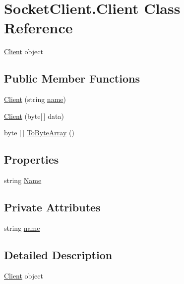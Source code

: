 \hypertarget{class_socket_client_1_1_client}{}\section{Socket\+Client.\+Client Class Reference}
\label{class_socket_client_1_1_client}


\hyperlink{class_socket_client_1_1_client}{Client} object  


\subsection*{Public Member Functions}
\begin{DoxyCompactItemize}
\item 
\hyperlink{class_socket_client_1_1_client_a28a95475e56ee3c7b77514f3723c9b54}{Client} (string \hyperlink{class_socket_client_1_1_client_a162db8b8ce5e35c270876f905b71c8b8}{name})
\item 
\hyperlink{class_socket_client_1_1_client_adb3d952f4dea32b3670e05d2c2b9ed0a}{Client} (byte\mbox{[}$\,$\mbox{]} data)
\item 
byte \mbox{[}$\,$\mbox{]} \hyperlink{class_socket_client_1_1_client_a6478de857e51cf018b5d6aef5d258571}{To\+Byte\+Array} ()
\end{DoxyCompactItemize}
\subsection*{Properties}
\begin{DoxyCompactItemize}
\item 
string \hyperlink{class_socket_client_1_1_client_a5eb03ddd11665bcd18f05f970433ec1b}{Name}
\end{DoxyCompactItemize}
\subsection*{Private Attributes}
\begin{DoxyCompactItemize}
\item 
string \hyperlink{class_socket_client_1_1_client_a162db8b8ce5e35c270876f905b71c8b8}{name}
\end{DoxyCompactItemize}


\subsection{Detailed Description}
\hyperlink{class_socket_client_1_1_client}{Client} object 



